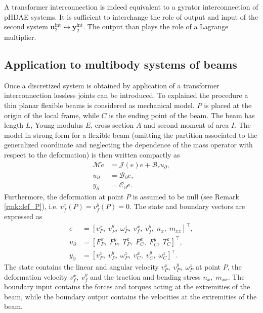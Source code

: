 A transformer interconnection is indeed equivalent to a gyrator interconnection of pHDAE systems.
It is sufficient to interchange the role of output and input of the second system $\bm{u}_2^{\text{int}} \leftrightarrow \bm{y}_2^{\text{int}}$. The output than plays the role of a Lagrange multiplier.


\subsection{Application to multibody systems of beams}
Once a discretized system is obtained by application of a transformer interconnection lossless joints can be introduced. To explained the procedure a thin planar flexible beams is considered as mechanical model. $P$ is placed at the origin of the local frame, while $C$ is the ending point of the beam. The beam has length $L$, Young modulus $E$, cross section $A$ and second moment of area $I$. The model in strong form for a flexible beam (omitting the partition associated to the generalized coordinate and neglecting the dependence of the mass operator with respect to the deformation) is then written compactly as 
\begin{equation}
\label{eq:EB_str_phdae}
\begin{aligned}
\mathcal{M} \dot{e} &= \mathcal{J}(e) e + \mathcal{B}_r u_\partial, \\
u_\partial &= \mathcal{B}_{\partial} e, \\
y_\partial &= \mathcal{C}_{\partial} e.
\end{aligned}
\end{equation}
Furthermore, the deformation at point $P$ is assumed to be null (see Remark \ref{rmk:def_P}), i.e. $v_f^x(P) = v_f^y(P) = 0$. The state and boundary vectors are expressed as
\begin{align*}
	e &= [v_P^x, \; v_P^y, \; \omega_P^z, \; v_f^x, \; v_f^y, \; n_x, \; m_{xx}]^\top, \\
	u_\partial &=  [F_{P}^x, \; F_{P}^y, \; T_{P}^z, \; F_{C}^x, \; F_{C}^y, \; T_{C}^z]^\top, \\
	y_\partial &=  [v_{P}^x, \; v_{P}^y, \; \omega_{P}^z, \; v_{C}^x, \; v_{C}^y, \; \omega_{C}^z]^\top.
\end{align*}
The state contains the linear and angular velocity $v_P^x, \; v_P^y, \; \omega_P^z$ at point $P$, the deformation velocity $ v_f^x, \; v_f^y$ and the traction and bending stress $n_x, \; m_{xx}$. The boundary input contains the forces and torques acting at the extremities of the beam, while the boundary output contains the velocities at the extremities of the beam.
